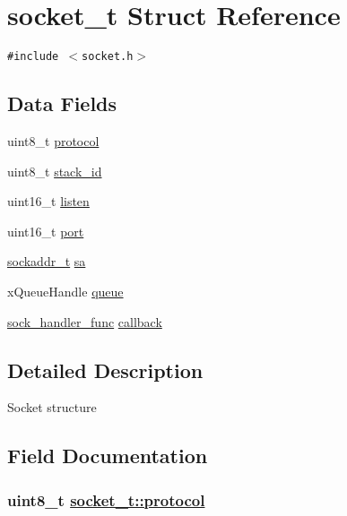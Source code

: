\hypertarget{structsocket__t}{
\section{socket\_\-t Struct Reference}
\label{structsocket__t}
}
{\tt \#include $<$socket.h$>$}

\subsection*{Data Fields}
\begin{CompactItemize}
\item 
uint8\_\-t \hyperlink{structsocket__t_70368ea424aea352c4705a6c210949f7}{protocol}
\item 
uint8\_\-t \hyperlink{structsocket__t_ac1f42ef7ee07bed7f96631b4752dabb}{stack\_\-id}
\item 
uint16\_\-t \hyperlink{structsocket__t_367f8e34a0abb424055cc8fcb3388705}{listen}
\item 
uint16\_\-t \hyperlink{structsocket__t_584532d6d7f8a88d0b8e5b263dba7621}{port}
\item 
\hyperlink{structsockaddr__t}{sockaddr\_\-t} \hyperlink{structsocket__t_dd056ea6adc14e1cb056e3195ee540c2}{sa}
\item 
x\-Queue\-Handle \hyperlink{structsocket__t_6fdb7e88bf89a5bc524a576a7b2a2ac8}{queue}
\item 
\hyperlink{socket_8h_7e2c49d774927dec68a715a09aaa3003}{sock\_\-handler\_\-func} \hyperlink{structsocket__t_e9c15a340c51976f69a600d9e2b7b716}{callback}
\end{CompactItemize}


\subsection{Detailed Description}
Socket structure 



\subsection{Field Documentation}
\hypertarget{structsocket__t_70368ea424aea352c4705a6c210949f7}{
\subsubsection[protocol]{\setlength{\rightskip}{0pt plus 5cm}uint8\_\-t \hyperlink{structsocket__t_70368ea424aea352c4705a6c210949f7}{socket\_\-t::protocol}}}
\label{structsocket__t_70368ea424aea352c4705a6c210949f7}


